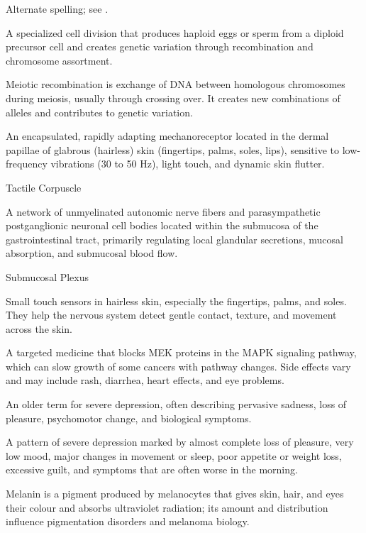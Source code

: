  Alternate spelling; see .

 A specialized cell division that produces haploid eggs or sperm from a diploid precursor cell and creates
genetic variation through recombination and chromosome assortment.

 Meiotic recombination is exchange of DNA between homologous chromosomes during meiosis, usually through crossing over. It creates new combinations of alleles and contributes to genetic variation.

 An encapsulated, rapidly adapting mechanoreceptor located in the dermal papillae of glabrous (hairless) skin (fingertips, palms, soles, lips), sensitive to low-frequency vibrations (30 to 50 Hz), light touch, and dynamic skin flutter.

\synonyms
Tactile Corpuscle

 A network of unmyelinated autonomic nerve fibers and parasympathetic postganglionic neuronal cell bodies located within the submucosa of the gastrointestinal tract, primarily regulating local glandular secretions, mucosal absorption, and submucosal blood flow.

\synonyms
Submucosal Plexus

 Small touch sensors in hairless skin, especially the fingertips, palms, and soles. They help the nervous system detect gentle contact, texture, and movement across the skin.

 A targeted medicine that blocks MEK proteins in the MAPK signaling pathway, which can slow growth of some cancers with pathway changes. Side effects vary and may include rash, diarrhea, heart effects, and eye problems.

 An older term for severe depression, often describing pervasive sadness, loss of pleasure, psychomotor change, and biological symptoms.

 A pattern of severe depression marked by almost complete loss of pleasure, very low mood, major changes in movement or sleep, poor appetite or weight loss, excessive guilt, and symptoms that are often worse in the morning.

 Melanin is a pigment produced by melanocytes that gives skin, hair, and eyes their colour and absorbs ultraviolet radiation; its amount and distribution influence pigmentation disorders and melanoma biology.

